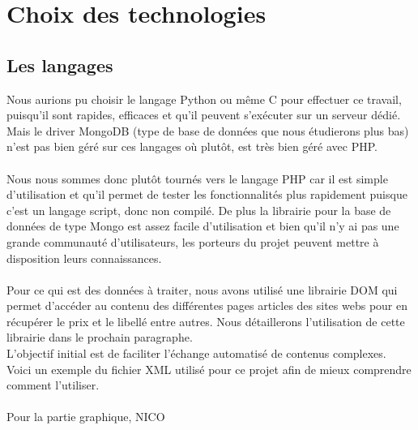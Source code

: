 \documentclass{report}
\begin{document}
\chapter{Choix des technologies}
\section{Les langages}
Nous aurions pu choisir le langage Python ou même C pour effectuer ce travail, puisqu'il sont rapides, efficaces et qu'il peuvent s'exécuter sur un serveur dédié. Mais le driver MongoDB (type de base de données que nous étudierons plus bas) n'est pas bien géré sur ces langages où plutôt, est très bien géré avec PHP.\\\\
Nous nous sommes donc plutôt tournés vers le langage PHP car il est simple d'utilisation et qu'il permet de tester les fonctionnalités plus rapidement puisque c'est un langage script, donc non compilé. De plus la librairie pour la base de données de type Mongo est assez facile d'utilisation et bien qu'il n'y ai pas une grande communauté d'utilisateurs, les porteurs du projet peuvent mettre à disposition leurs connaissances.\\\\
Pour ce qui est des données à traiter, nous avons utilisé une librairie DOM qui permet d'accéder au contenu des différentes pages articles des sites webs pour en récupérer le prix et le libellé entre autres.
Nous détaillerons l'utilisation de cette librairie dans le prochain paragraphe.\\
L'objectif initial est de faciliter l'échange automatisé de contenus complexes.\\
Voici un exemple du fichier XML utilisé pour ce projet afin de mieux comprendre comment l'utiliser.\\\\
Pour la partie graphique, NICO
~\\
\end{document}
